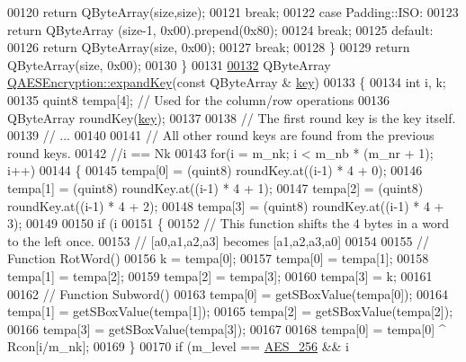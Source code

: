 \begin{DoxyCode}
00120         \textcolor{keywordflow}{return} QByteArray(size,size);
00121         \textcolor{keywordflow}{break};
00122     \textcolor{keywordflow}{case} Padding::ISO:
00123         \textcolor{keywordflow}{return} QByteArray (size-1, 0x00).prepend(0x80);
00124         \textcolor{keywordflow}{break};
00125     \textcolor{keywordflow}{default}:
00126         \textcolor{keywordflow}{return} QByteArray(size, 0x00);
00127         \textcolor{keywordflow}{break};
00128     \}
00129     \textcolor{keywordflow}{return} QByteArray(size, 0x00);
00130 \}
00131 
\mbox{\hyperlink{class_q_a_e_s_encryption_a5bfbb972f84a8376fceed648553c0912}{00132}} QByteArray \mbox{\hyperlink{class_q_a_e_s_encryption_a5bfbb972f84a8376fceed648553c0912}{QAESEncryption::expandKey}}(\textcolor{keyword}{const} QByteArray &
      \mbox{\hyperlink{namespace_errors_dict_setup_a09c268098d09ffb8e5504f30fa6d5dd9}{key}})
00133 \{
00134   \textcolor{keywordtype}{int} i, k;
00135   quint8 tempa[4]; \textcolor{comment}{// Used for the column/row operations}
00136   QByteArray roundKey(\mbox{\hyperlink{namespace_errors_dict_setup_a09c268098d09ffb8e5504f30fa6d5dd9}{key}});
00137 
00138   \textcolor{comment}{// The first round key is the key itself.}
00139   \textcolor{comment}{// ...}
00140 
00141   \textcolor{comment}{// All other round keys are found from the previous round keys.}
00142   \textcolor{comment}{//i == Nk}
00143   \textcolor{keywordflow}{for}(i = m\_nk; i < m\_nb * (m\_nr + 1); i++)
00144   \{
00145     tempa[0] = (quint8) roundKey.at((i-1) * 4 + 0);
00146     tempa[1] = (quint8) roundKey.at((i-1) * 4 + 1);
00147     tempa[2] = (quint8) roundKey.at((i-1) * 4 + 2);
00148     tempa[3] = (quint8) roundKey.at((i-1) * 4 + 3);
00149 
00150     \textcolor{keywordflow}{if} (i %
00151     \{
00152         \textcolor{comment}{// This function shifts the 4 bytes in a word to the left once.}
00153         \textcolor{comment}{// [a0,a1,a2,a3] becomes [a1,a2,a3,a0]}
00154 
00155         \textcolor{comment}{// Function RotWord()}
00156         k = tempa[0];
00157         tempa[0] = tempa[1];
00158         tempa[1] = tempa[2];
00159         tempa[2] = tempa[3];
00160         tempa[3] = k;
00161 
00162         \textcolor{comment}{// Function Subword()}
00163         tempa[0] = getSBoxValue(tempa[0]);
00164         tempa[1] = getSBoxValue(tempa[1]);
00165         tempa[2] = getSBoxValue(tempa[2]);
00166         tempa[3] = getSBoxValue(tempa[3]);
00167 
00168         tempa[0] =  tempa[0] ^ Rcon[i/m\_nk];
00169     \}
00170     \textcolor{keywordflow}{if} (m\_level == \mbox{\hyperlink{class_q_a_e_s_encryption_abe48208f4f6c7d68e6a10b49b9d0b7bdacde97774ab1d4c609e04b0dd13a1e1f7}{AES\_256}} && i %

\end{DoxyCode}
